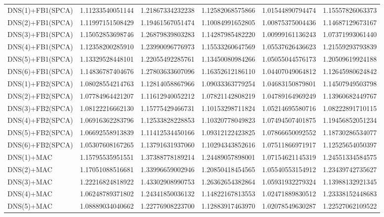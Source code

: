 \begin{table}[htb]
\begin{adjustbox}{totalheight=\baselineskip}
\begin{tabular}{lSSSSS}
DNS(1)+FB1(SPCA) & 1.11233540051144 & 1.21867334232238 & 1.12582068575866 & 1.01544890794474 & 1.15557826063373 \\ 
DNS(2)+FB1(SPCA) & 1.11997151508429 & 1.19461567051474 & 1.10084991652805 & 1.00875375004436 & 1.14687129673167 \\ 
DNS(3)+FB1(SPCA) & 1.15052853698746 & 1.26879839803283 & 1.14287985482220 & 1.00999161136243 & 1.07371993061440 \\ 
DNS(4)+FB1(SPCA) & 1.12358200285910 & 1.23990096776973 & 1.15533260647569 & 1.05537626436623 & 1.21559293793839 \\ 
DNS(5)+FB1(SPCA) & 1.13329528448101 & 1.22055492285761 & 1.13450080984266 & 1.05055044576173 & 1.20509619924188 \\ 
DNS(6)+FB1(SPCA) & 1.14836787404676 & 1.27803633607096 & 1.16352612186110 & 1.04407049064812 & 1.12645980624842 \\ 
DNS(1)+FB2(SPCA) & 1.08028554214763 & 1.12814058867966 & 1.09033363779254 & 1.04683150879801 & 1.14507949503798 \\ 
DNS(2)+FB2(SPCA) & 1.07784964421207 & 1.11612940052212 & 1.07821142808219 & 1.04789164969249 & 1.13960682449767 \\ 
DNS(3)+FB2(SPCA) & 1.08122216662130 & 1.15775429466731 & 1.10153298711824 & 1.05214695580716 & 1.08222891710115 \\ 
DNS(4)+FB2(SPCA) & 1.06916362283796 & 1.12533828228853 & 1.10320778049823 & 1.07494507401875 & 1.19456852051234 \\ 
DNS(5)+FB2(SPCA) & 1.06692558913839 & 1.11412534450166 & 1.09312122423825 & 1.07866650092552 & 1.18730286534077 \\ 
DNS(6)+FB2(SPCA) & 1.05307608167265 & 1.13791631937060 & 1.10294343852616 & 1.07511866971917 & 1.12525654050397 \\ 
DNS(1)+MAC & 1.15795535951551 & 1.37388778189214 & 1.24489057898001 & 1.07154621145319 & 1.24551334584575 \\ 
DNS(2)+MAC & 1.17051088516681 & 1.33996659002946 & 1.20850418454565 & 1.05540553154912 & 1.23439742735627 \\ 
DNS(3)+MAC & 1.22216824818922 & 1.43302908990753 & 1.26362654382864 & 1.05931932279324 & 1.13988132921345 \\ 
DNS(4)+MAC & 1.06248789371802 & 1.24341850036132 & 1.14822167813553 & 1.02471889830512 & 1.23338152448683 \\ 
DNS(5)+MAC & 1.08889034040662 & 1.22776908223700 & 1.12883917463970 & 1.02078549630287 & 1.22527062109522 \\ 

\end{tabular}
\end{adjustbox}
\end{table}
